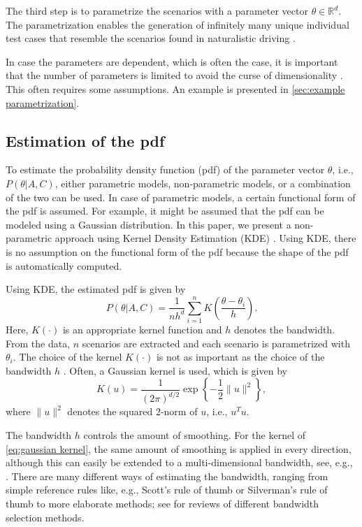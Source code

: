 The third step is to parametrize the scenarios with a parameter vector $\theta \in \mathbb{R}^d$. The parametrization enables the generation of infinitely many unique individual test cases that resemble the scenarios found in naturalistic driving \cite{deGelder2017assessment,elrofai2018scenario}.

In case the parameters are dependent, which is often the case, it is important that the number of parameters is limited to avoid the curse of dimensionality \cite{scott2015multivariate}. This often requires some assumptions. An example is presented in \cref{sec:example parametrization}.



\subsection{Estimation of the pdf}
\label{sec:pdf}

To estimate the probability density function (pdf) of the parameter vector $\theta$, i.e., $P(\theta|A,C)$, either parametric models, non-parametric models, or a combination of the two can be used. In case of parametric models, a certain functional form of the pdf is assumed. For example, it might be assumed that the pdf can be modeled using a Gaussian distribution. In this paper, we present a non-parametric approach using Kernel Density Estimation (KDE) \cite{rosenblatt1956remarks, parzen1962estimation}. Using KDE, there is no assumption on the functional form of the pdf because the shape of the pdf is automatically computed.

Using KDE, the estimated pdf is given by
\begin{equation}
	\label{eq:kde}
	P(\theta|A,C) = \frac{1}{nh^d} \sum_{i=1}^n K\left(\frac{\theta - \theta_i}{h}\right).
\end{equation}
Here, $K(\cdot)$ is an appropriate kernel function and $h$ denotes the bandwidth. From the data, $n$ scenarios are extracted and each scenario is parametrized with $\theta_i$. The choice of the kernel $K(\cdot)$ is not as important as the choice of the bandwidth $h$ \cite{turlach1993bandwidthselection}. Often, a Gaussian kernel is used, which is given by
\begin{equation}
	\label{eq:gaussian kernel}
	K(u) = \frac{1}{\left( 2\pi \right)^{d/2}} \exp \left\{ -\frac{1}{2} \|u\|^2 \right\},
\end{equation}
where $\|u\|^2$ denotes the squared 2-norm of $u$, i.e., $u^T u$.

The bandwidth $h$ controls the amount of smoothing. For the kernel of \cref{eq:gaussian kernel}, the same amount of smoothing is applied in every direction, although this can easily be extended to a multi-dimensional bandwidth, see, e.g., \cite{scott2005multidimensional, chen2017tutorial}. There are many different ways of estimating the bandwidth, ranging from simple reference rules like, e.g., Scott's rule of thumb \cite{scott2015multivariate} or Silverman's rule of thumb \cite{silverman1986density} to more elaborate methods; see \cite{turlach1993bandwidthselection, bashtannyk2001bandwidth, jones1996brief, chiu1996comparative} for reviews of different bandwidth selection methods. 




